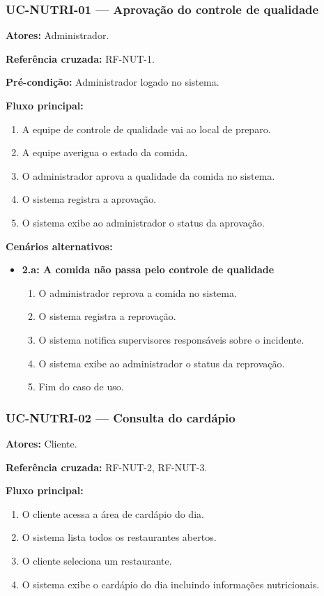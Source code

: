 \documentclass[12pt,a4paper]{article}
\begin{document}
\subsubsection{UC-NUTRI-01 — Aprovação do controle de qualidade}
\textbf{Atores:} Administrador.  

\textbf{Referência cruzada:} RF-NUT-1.  

\textbf{Pré-condição:} Administrador logado no sistema.  

\textbf{Fluxo principal:}
\begin{enumerate}
    \item A equipe de controle de qualidade vai ao local de preparo.
    \item A equipe averigua o estado da comida.
    \item O administrador aprova a qualidade da comida no sistema.
    \item O sistema registra a aprovação.
    \item O sistema exibe ao administrador o status da aprovação.
\end{enumerate}

\textbf{Cenários alternativos:}
\begin{itemize}
    \item \textbf{2.a: A comida não passa pelo controle de qualidade}  
    \begin{enumerate}
        \item O administrador reprova a comida no sistema.
        \item O sistema registra a reprovação.
        \item O sistema notifica supervisores responsáveis sobre o incidente.
        \item O sistema exibe ao administrador o status da reprovação.
        \item Fim do caso de uso.
    \end{enumerate}
\end{itemize}

\subsubsection{UC-NUTRI-02 — Consulta do cardápio}
\textbf{Atores:} Cliente.  

\textbf{Referência cruzada:} RF-NUT-2, RF-NUT-3.  

\textbf{Fluxo principal:}
\begin{enumerate}
    \item O cliente acessa a área de cardápio do dia.
    \item O sistema lista todos os restaurantes abertos.
    \item O cliente seleciona um restaurante.
    \item O sistema exibe o cardápio do dia incluindo informações nutricionais.
\end{enumerate}
\end{document}
